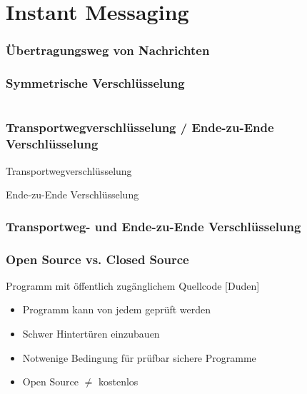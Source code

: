 \section{Instant Messaging}


\begin{frame}
  \frametitle{Übertragungsweg von Nachrichten}
  \center {}
\end{frame}

\begin{frame}
  \frametitle{Symmetrische Verschlüsselung}
  \begin{columns}[c]
    \begin{column}{0.5\textwidth}
      \center {}
    \end{column}
  \end{columns}
\end{frame}

\begin{frame}
  \frametitle{Transportwegverschlüsselung / Ende-zu-Ende Verschlüsselung}
  Transportwegverschlüsselung
  \begin{center}
  \end{center}


  Ende-zu-Ende Verschlüsselung
  \center {}
\end{frame}

\begin{frame}
  \frametitle{Transportweg- und Ende-zu-Ende Verschlüsselung}
\end{frame}

\begin{frame}
  \frametitle{Open Source vs. Closed Source}
  \begin{definition}
   Programm mit öffentlich zugänglichem Quellcode \hfill \tiny [Duden]
  \end{definition}

  \begin{itemize}
   \item Programm kann von jedem geprüft werden
   \item Schwer Hintertüren einzubauen
   \item Notwenige Bedingung für prüfbar sichere Programme
   \item Open Source $\neq$ kostenlos
  \end{itemize}

\end{frame}


